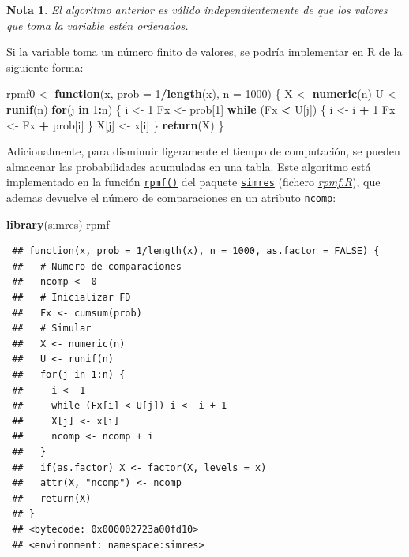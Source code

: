 \documentclass[
  spanish,
  10pt,
]{book}
\newenvironment{Shaded}{\begin{snugshade}}{\end{snugshade}}
\newcommand{\AttributeTok}[1]{\textcolor[rgb]{0.13,0.29,0.53}{#1}}
\newcommand{\ControlFlowTok}[1]{\textcolor[rgb]{0.13,0.29,0.53}{\textbf{#1}}}
\newcommand{\DecValTok}[1]{\textcolor[rgb]{0.00,0.00,0.81}{#1}}
\newcommand{\FunctionTok}[1]{\textcolor[rgb]{0.13,0.29,0.53}{\textbf{#1}}}
\newcommand{\NormalTok}[1]{#1}
\newcommand{\OtherTok}[1]{\textcolor[rgb]{0.56,0.35,0.01}{#1}}
\newcommand{\SpecialCharTok}[1]{\textcolor[rgb]{0.81,0.36,0.00}{\textbf{#1}}}
\theoremstyle{break}
\theoremstyle{nonumberplain}
\newtheorem{remark}{Nota}
\begin{document}
\begin{remark}
El algoritmo anterior es válido independientemente de que los valores que toma la variable estén ordenados.
\end{remark}

Si la variable toma un número finito de valores, se podría implementar en R de la siguiente forma:

\begin{Shaded}
\begin{Highlighting}[]
\NormalTok{rpmf0 }\OtherTok{\textless{}{-}} \ControlFlowTok{function}\NormalTok{(x, }\AttributeTok{prob =} \DecValTok{1}\SpecialCharTok{/}\FunctionTok{length}\NormalTok{(x), }\AttributeTok{n =} \DecValTok{1000}\NormalTok{) \{}
\NormalTok{  X }\OtherTok{\textless{}{-}} \FunctionTok{numeric}\NormalTok{(n)}
\NormalTok{  U }\OtherTok{\textless{}{-}} \FunctionTok{runif}\NormalTok{(n)}
  \ControlFlowTok{for}\NormalTok{(j }\ControlFlowTok{in} \DecValTok{1}\SpecialCharTok{:}\NormalTok{n) \{}
\NormalTok{    i }\OtherTok{\textless{}{-}} \DecValTok{1}
\NormalTok{    Fx }\OtherTok{\textless{}{-}}\NormalTok{ prob[}\DecValTok{1}\NormalTok{]}
    \ControlFlowTok{while}\NormalTok{ (Fx }\SpecialCharTok{\textless{}}\NormalTok{ U[j]) \{}
\NormalTok{      i }\OtherTok{\textless{}{-}}\NormalTok{ i }\SpecialCharTok{+} \DecValTok{1}
\NormalTok{      Fx }\OtherTok{\textless{}{-}}\NormalTok{ Fx }\SpecialCharTok{+}\NormalTok{ prob[i]}
\NormalTok{    \}}
\NormalTok{    X[j] }\OtherTok{\textless{}{-}}\NormalTok{ x[i]}
\NormalTok{  \}}
  \FunctionTok{return}\NormalTok{(X)}
\NormalTok{\}}
\end{Highlighting}
\end{Shaded}

Adicionalmente, para disminuir ligeramente el tiempo de computación, se pueden almacenar las probabilidades acumuladas en una tabla.
Este algoritmo está implementado en la función \href{https://rubenfcasal.github.io/simres/reference/rpmf.html}{\texttt{rpmf()}} del paquete \href{https://rubenfcasal.github.io/simres}{\texttt{simres}} (fichero \href{R/rpmf.R}{\emph{rpmf.R}}), que ademas devuelve el número de comparaciones en un atributo \texttt{ncomp}:

\begin{Shaded}
\begin{Highlighting}[]
\FunctionTok{library}\NormalTok{(simres)}
\NormalTok{rpmf}
\end{Highlighting}
\end{Shaded}

\begin{verbatim}
 ## function(x, prob = 1/length(x), n = 1000, as.factor = FALSE) {
 ##   # Numero de comparaciones
 ##   ncomp <- 0
 ##   # Inicializar FD
 ##   Fx <- cumsum(prob)
 ##   # Simular
 ##   X <- numeric(n)
 ##   U <- runif(n)
 ##   for(j in 1:n) {
 ##     i <- 1
 ##     while (Fx[i] < U[j]) i <- i + 1
 ##     X[j] <- x[i]
 ##     ncomp <- ncomp + i
 ##   }
 ##   if(as.factor) X <- factor(X, levels = x)
 ##   attr(X, "ncomp") <- ncomp
 ##   return(X)
 ## }
 ## <bytecode: 0x000002723a00fd10>
 ## <environment: namespace:simres>
\end{verbatim}
\end{document}
